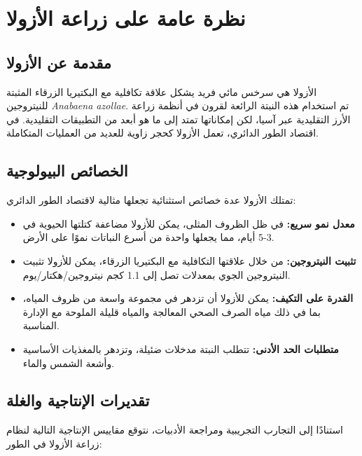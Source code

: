 \section{نظرة عامة على زراعة الأزولا}

\subsection{مقدمة عن الأزولا}

الأزولا هي سرخس مائي فريد يشكل علاقة تكافلية مع البكتيريا الزرقاء المثبتة للنيتروجين \textit{Anabaena azollae}. تم استخدام هذه النبتة الرائعة لقرون في أنظمة زراعة الأرز التقليدية عبر آسيا، لكن إمكاناتها تمتد إلى ما هو أبعد من التطبيقات التقليدية. في اقتصاد الطور الدائري، تعمل الأزولا كحجر زاوية للعديد من العمليات المتكاملة.

\subsection{الخصائص البيولوجية}

تمتلك الأزولا عدة خصائص استثنائية تجعلها مثالية لاقتصاد الطور الدائري:

\begin{itemize}
    \item \textbf{معدل نمو سريع:} في ظل الظروف المثلى، يمكن للأزولا مضاعفة كتلتها الحيوية في 3-5 أيام، مما يجعلها واحدة من أسرع النباتات نموًا على الأرض.
    
    \item \textbf{تثبيت النيتروجين:} من خلال علاقتها التكافلية مع البكتيريا الزرقاء، يمكن للأزولا تثبيت النيتروجين الجوي بمعدلات تصل إلى 1.1 كجم نيتروجين/هكتار/يوم.
    
    \item \textbf{القدرة على التكيف:} يمكن للأزولا أن تزدهر في مجموعة واسعة من ظروف المياه، بما في ذلك مياه الصرف الصحي المعالجة والمياه قليلة الملوحة مع الإدارة المناسبة.
    
    \item \textbf{متطلبات الحد الأدنى:} تتطلب النبتة مدخلات ضئيلة، وتزدهر بالمغذيات الأساسية وأشعة الشمس والماء.
\end{itemize}

\subsection{تقديرات الإنتاجية والغلة}

استنادًا إلى التجارب التجريبية ومراجعة الأدبيات، نتوقع مقاييس الإنتاجية التالية لنظام زراعة الأزولا في الطور:

